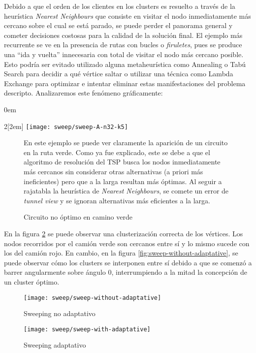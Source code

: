 Debido a que el orden de los clientes en los clusters es resuelto a través de la heurística \textit{Nearest Neighbours} que consiste en visitar el nodo inmediatamente más cercano sobre el cual se está parado, se puede perder el panorama general y cometer decisiones costosas para la calidad de la solución final. El ejemplo más recurrente se ve en la presencia de rutas con bucles o \textit{firuletes}, pues se produce una ``ida y vuelta'' innecesaria con total de visitar el nodo más cercano posible. Esto podría ser evitado utilizado alguna metaheurística como Annealing o Tabú Search para decidir a qué vértice saltar o utilizar una técnica como Lambda Exchange para optimizar e intentar eliminar estas manifestaciones del problema descripto. Analizaremos este fenómeno gráficamente:

\parindent0em
\begin{multicols}{2}[\columnsep2em]
		\texttt{[image: sweep/sweep-A-n32-k5]}
\columnbreak
	\begin{figure}[H]
		\caption{Circuito no óptimo en camino verde} \label{fig:sweep-A-n32-k5}
		\vskip 4pt
		En este ejemplo se puede ver claramente la aparición de un circuito en la ruta verde. Como ya fue explicado, este se debe a que el algoritmo de resolución del TSP busca los nodos inmediatamente más cercanos sin considerar otras alternativas (a priori más ineficientes) pero que a la larga resultan más óptimas. Al seguir a rajatabla la heurística de \textit{Nearest Neighbours}, se comete un error de \textit{tunnel view} y se ignoran alternativas más eficientes a la larga.
	\end{figure}
\end{multicols}

En la figura \ref{fig:sweep-with-adaptative} se puede observar una clusterización correcta de los vértices. Los nodos recorridos por el camión verde son cercanos entre sí y lo mismo sucede con los del camión rojo. En cambio, en la figura \ref{fig:sweep-without-adaptative}, se puede observar cómo los clusters se interponen entre sí debido a que se comenzó a barrer angularmente sobre ángulo $0$, interrumpiendo a la mitad la concepción de un cluster óptimo.
\begin{figure}[H]
	\centering
	\begin{minipage}{0.48\textwidth}
		\centering
		\texttt{[image: sweep/sweep-without-adaptative]}
		\caption{\footnotesize Sweeping no adaptativo}
		\label{fig:sweep-without-adaptative}
	\end{minipage}%
	\hspace{0.03\textwidth}
	\begin{minipage}{0.48\textwidth}
		\centering
		\texttt{[image: sweep/sweep-with-adaptative]}
		\caption{\footnotesize Sweeping adaptativo}
		\label{fig:sweep-with-adaptative}
	\end{minipage}%
\end{figure}

